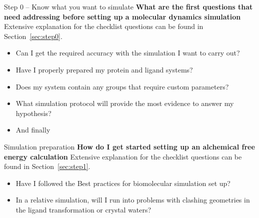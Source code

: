 \documentclass[9pt,bestpractices]{livecoms}
\begin{document}
\begin{Checklists*}[p!]

\begin{checklist}{Step 0 -- Know what you want to simulate }
\textbf{What are the first questions that need addressing before setting up a molecular dynamics simulation}\\
Extensive explanation for the checklist questions can be found in Section~\ref{sec:step0}.
\begin{itemize}
\item Can I get the required accuracy with the simulation I want to carry out?
\item Have I properly prepared my protein and ligand systems?
\item Does my system contain any groups that require custom parameters?
\item What simulation protocol will provide the most evidence to answer my hypothesis?

\item And finally
\end{itemize}
\end{checklist}

\begin{checklist}{Simulation preparation}
\textbf{How do I get started setting up an alchemical free energy calculation}
Extensive explanation for the checklist questions can be found in Section~\ref{sec:step1}.
\begin{itemize}
\item Have I followed the Best practices for biomolecular simulation set up?
\item In a relative simulation, will I run into problems with clashing geometries in the ligand transformation or crystal waters?
\end{itemize}
\end{checklist}
\end{Checklists*}
\end{document}
